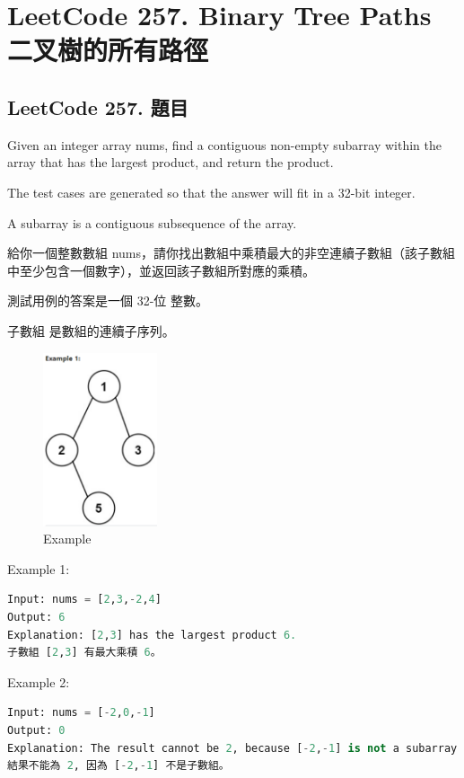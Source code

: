 \documentclass[10pt,UTF8]{ctexart}
\begin{document}
\section{LeetCode 257. Binary Tree Paths 二叉樹的所有路徑}

\subsection{LeetCode 257. 題目}

Given an integer array nums, find a contiguous non-empty subarray within the array that has the largest product, and return the product.

The test cases are generated so that the answer will fit in a 32-bit integer.

A subarray is a contiguous subsequence of the array.

給你一個整數數組 nums，請你找出數組中乘積最大的非空連續子數組（該子數組中至少包含一個數字），並返回該子數組所對應的乘積。

測試用例的答案是一個 32-位 整數。

子數組 是數組的連續子序列。

\begin{figure}[H]
\centering 
\includegraphics[width=0.30\textwidth]{lc-257-p-example.png} 
\caption{Example}
\label{Test}
\end{figure}


Example 1:

\begin{lstlisting}[language={python}]
Input: nums = [2,3,-2,4]
Output: 6
Explanation: [2,3] has the largest product 6.
子數組 [2,3] 有最大乘積 6。
\end{lstlisting}

Example 2:

\begin{lstlisting}[language={python}]
Input: nums = [-2,0,-1]
Output: 0
Explanation: The result cannot be 2, because [-2,-1] is not a subarray.
結果不能為 2, 因為 [-2,-1] 不是子數組。
\end{lstlisting}
\end{document}

